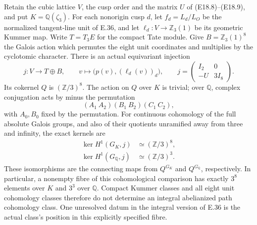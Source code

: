 \begin{proposition}
\label{E-integral-path-comparison}
Retain the cubic lattice $V$, the cusp order and the matrix $U$
of (E18.8)--(E18.9), and put $K=\mathbb Q(\zeta_3)$.
For each nonorigin cusp $d$, let $f_d=L_d/L_O$ be the
normalized tangent-line unit of E.36, and let
$\ell_d:V\to\mathbb Z_3(1)$ be its geometric Kummer map.
Write $T=T_3E$ for the compact Tate module. Give
$B=\mathbb Z_3(1)^8$ the Galois action which permutes the
eight unit coordinates and multiplies by the cyclotomic
character. There is an actual equivariant injection
\[
 j:V\longrightarrow T\oplus B,\qquad
 v\longmapsto\bigl(p(v),(\ell_d(v))_d\bigr),\qquad
 j=\begin{pmatrix}I_2&0\\-U&3I_8\end{pmatrix}.
 \tag{E.39.1}
\]
Its cokernel $Q$ is $(\mathbb Z/3)^8$. The action on $Q$
over $K$ is trivial; over $\mathbb Q$, complex conjugation
acts by minus the permutation
\[
 (A_1\ A_2)(B_1\ B_2)(C_1\ C_2),
 \tag{E.39.2}
\]
with $A_0,B_0$ fixed by the permutation.
For continuous cohomology of the full absolute Galois
groups, and also of their quotients unramified away from
three and infinity, the exact kernels are
\[
 \begin{aligned}
 \ker H^1(G_K,j)&\simeq(\mathbb Z/3)^8,\\
 \ker H^1(G_{\mathbb Q},j)&\simeq(\mathbb Z/3)^3.
 \end{aligned}
 \tag{E.39.3}
\]
These isomorphisms are the connecting maps from $Q^{G_K}$
and $Q^{G_{\mathbb Q}}$, respectively. In particular, a
nonempty fibre of this cohomological comparison has
exactly $3^8$ elements over $K$ and $3^3$ over
$\mathbb Q$. Compact Kummer classes and all eight unit
cohomology classes therefore do not determine an integral
abelianized path cohomology class. One unresolved datum
in the integral version of E.36 is the actual class's
position in this explicitly specified fibre.
\end{proposition}
